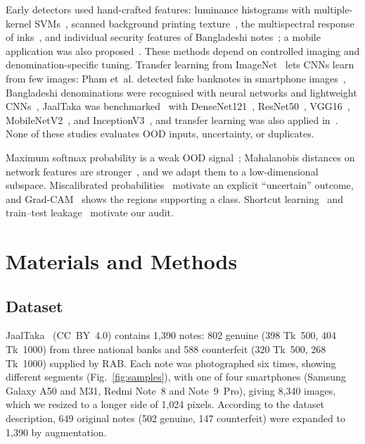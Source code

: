\documentclass[pdflatex,iicol,sn-mathphys-num]{sn-jnl}
\begin{document}
Early detectors used hand-crafted features: luminance histograms with multiple-kernel
SVMs~\cite{yeh2011}, scanned background printing texture~\cite{berenguel2016}, the
multispectral response of inks~\cite{baek2018}, and individual security features of
Bangladeshi notes~\cite{uddin2016}; a mobile application was also
proposed~\cite{dittimi2018}. These methods depend on controlled imaging and
denomination-specific tuning. Transfer learning from
ImageNet~\cite{deng2009imagenet,yosinski2014transferable} lets CNNs learn from few
images: Pham et~al. detected fake banknotes in smartphone images~\cite{pham2020,pham2022},
Bangladeshi denominations were recognised with neural networks and lightweight
CNNs~\cite{jahangir2007,linkon2020}, JaalTaka was benchmarked~\cite{piyas2025jaaltaka}
with DenseNet121~\cite{huang2017densenet}, ResNet50~\cite{he2016resnet},
VGG16~\cite{simonyan2015vgg}, MobileNetV2~\cite{sandler2018mobilenetv2}, and
InceptionV3~\cite{szegedy2016inception}, and transfer learning was also applied
in~\cite{tabassum2025}. None of these studies evaluates OOD inputs, uncertainty, or
duplicates.

Maximum softmax probability is a weak OOD signal~\cite{hendrycks2017baseline};
Mahalanobis distances on network features are stronger~\cite{lee2018mahalanobis}, and we
adapt them to a low-dimensional subspace. Miscalibrated
probabilities~\cite{guo2017calibration} motivate an explicit ``uncertain'' outcome, and
Grad-CAM~\cite{selvaraju2017gradcam} shows the regions supporting a class. Shortcut
learning~\cite{geirhos2020shortcut} and train--test leakage~\cite{kapoor2023leakage}
motivate our audit.

\section{Materials and Methods}\label{sec:method}

\subsection{Dataset}\label{sec:data}

JaalTaka~\cite{piyas2025jaaltaka,jaaltaka_data} (CC~BY~4.0) contains 1{,}390 notes:
802 genuine (398 Tk~500, 404 Tk~1000) from three national banks and 588 counterfeit
(320 Tk~500, 268 Tk~1000) supplied by RAB. Each note was photographed six times, showing
different segments (Fig.~\ref{fig:samples}), with one of four smartphones (Samsung Galaxy
A50 and M31, Redmi Note~8 and Note~9~Pro), giving 8{,}340 images, which we resized to a
longer side of 1{,}024 pixels. According to the dataset description, 649 original notes
(502 genuine, 147 counterfeit) were expanded to 1{,}390 by augmentation.
\end{document}
